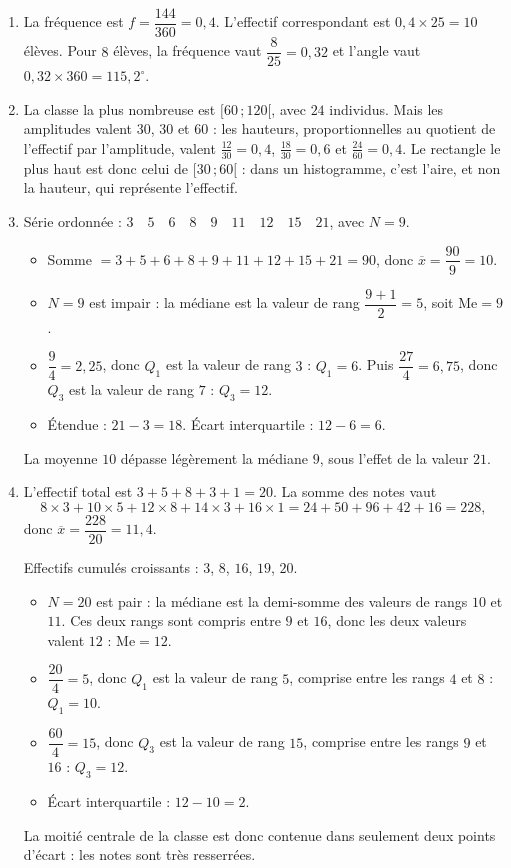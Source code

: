 \begin{enumerate}
  \item La fréquence est $f = \dfrac{144}{360} = 0{,}4$. L'effectif correspondant
    est $0{,}4 \times 25 = 10$ élèves. Pour $8$ élèves, la fréquence vaut
    $\dfrac{8}{25} = 0{,}32$ et l'angle vaut $0{,}32 \times 360 = 115{,}2^\circ$.

  \item La classe la plus nombreuse est $[60\,;120[$, avec $24$ individus. Mais les
    amplitudes valent $30$, $30$ et $60$ : les hauteurs, proportionnelles au
    quotient de l'effectif par l'amplitude, valent $\frac{12}{30} = 0{,}4$,
    $\frac{18}{30} = 0{,}6$ et $\frac{24}{60} = 0{,}4$. Le rectangle le plus haut
    est donc celui de $[30\,;60[$ : dans un histogramme, c'est l'aire, et non la
    hauteur, qui représente l'effectif.

  \item Série ordonnée :
    $3 \quad 5 \quad 6 \quad 8 \quad 9 \quad 11 \quad 12 \quad 15 \quad 21$, avec
    $N = 9$.
    \begin{itemize}
      \item Somme $= 3+5+6+8+9+11+12+15+21 = 90$, donc
        $\overline{x} = \dfrac{90}{9} = 10$.
      \item $N = 9$ est impair : la médiane est la valeur de rang
        $\dfrac{9+1}{2} = 5$, soit $\mathrm{Me} = 9$.
      \item $\dfrac{9}{4} = 2{,}25$, donc $Q_1$ est la valeur de rang $3$ :
        $Q_1 = 6$. Puis $\dfrac{27}{4} = 6{,}75$, donc $Q_3$ est la valeur de
        rang $7$ : $Q_3 = 12$.
      \item Étendue : $21 - 3 = 18$. Écart interquartile : $12 - 6 = 6$.
    \end{itemize}
    La moyenne $10$ dépasse légèrement la médiane $9$, sous l'effet de la valeur
    $21$.

  \item L'effectif total est $3+5+8+3+1 = 20$. La somme des notes vaut
    \[
      8 \times 3 + 10 \times 5 + 12 \times 8 + 14 \times 3 + 16 \times 1
      = 24 + 50 + 96 + 42 + 16 = 228,
    \]
    donc $\overline{x} = \dfrac{228}{20} = 11{,}4$.

    Effectifs cumulés croissants : $3$, $8$, $16$, $19$, $20$.
    \begin{itemize}
      \item $N = 20$ est pair : la médiane est la demi-somme des valeurs de rangs
        $10$ et $11$. Ces deux rangs sont compris entre $9$ et $16$, donc les deux
        valeurs valent $12$ : $\mathrm{Me} = 12$.
      \item $\dfrac{20}{4} = 5$, donc $Q_1$ est la valeur de rang $5$, comprise
        entre les rangs $4$ et $8$ : $Q_1 = 10$.
      \item $\dfrac{60}{4} = 15$, donc $Q_3$ est la valeur de rang $15$, comprise
        entre les rangs $9$ et $16$ : $Q_3 = 12$.
      \item Écart interquartile : $12 - 10 = 2$.
    \end{itemize}
    La moitié centrale de la classe est donc contenue dans seulement deux points
    d'écart : les notes sont très resserrées.


\end{enumerate}
